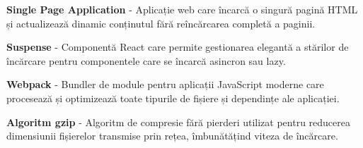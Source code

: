 \documentclass[12pt,a4paper]{report}
\begin{document}
\textbf{Single Page Application} - Aplicație web care încarcă o singură pagină HTML și actualizează dinamic conținutul fără reîncărcarea completă a paginii.

\textbf{Suspense} - Componentă React care permite gestionarea elegantă a stărilor de încărcare pentru componentele care se încarcă asincron sau lazy.

\textbf{Webpack} - Bundler de module pentru aplicații JavaScript moderne care procesează și optimizează toate tipurile de fișiere și dependințe ale aplicației.

\textbf{Algoritm gzip} - Algoritm de compresie fără pierderi utilizat pentru reducerea dimensiunii fișierelor transmise prin rețea, îmbunătățind viteza de încărcare.



\end{document}
